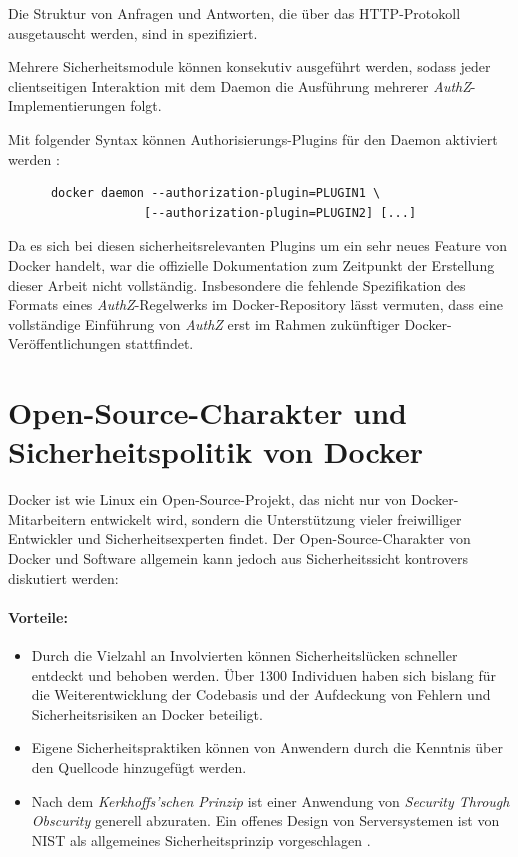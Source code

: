 \documentclass[../main.tex]{subfiles}
\begin{document}
    Die Struktur von Anfragen und Antworten, die über das HTTP-Protokoll ausgetauscht werden, sind in \cite{githubAuthZExtended} spezifiziert.

    Mehrere Sicherheitsmodule können konsekutiv ausgeführt werden, sodass jeder clientseitigen Interaktion mit dem Daemon die Ausführung mehrerer \emph{AuthZ}-Implementierungen folgt.

    Mit folgender Syntax können Authorisierungs-Plugins für den Daemon aktiviert werden \cite{githubAuthZExtended}:

    \begin{lstlisting}
      docker daemon --authorization-plugin=PLUGIN1 \
                   [--authorization-plugin=PLUGIN2] [...]
    \end{lstlisting}

    Da es sich bei diesen sicherheitsrelevanten Plugins um ein sehr neues Feature von Docker handelt, war die offizielle Dokumentation zum Zeitpunkt der Erstellung dieser Arbeit nicht vollständig. Insbesondere die fehlende Spezifikation des Formats eines \emph{AuthZ}-Regelwerks im Docker-Repository lässt vermuten, dass eine vollständige Einführung von \emph{AuthZ} erst im Rahmen zukünftiger Docker-Veröffentlichungen stattfindet.

  \section{Open-Source-Charakter und Sicherheitspolitik von Docker}
  \label{opensource}
    Docker ist wie Linux ein Open-Source-Projekt, das nicht nur von Docker-Mitarbeitern entwickelt wird, sondern die Unterstützung vieler freiwilliger Entwickler und Sicherheitsexperten findet. Der Open-Source-Charakter von Docker und Software allgemein kann jedoch aus Sicherheitssicht kontrovers diskutiert werden:

    \paragraph{Vorteile:}
    \begin{itemize}
      \item Durch die Vielzahl an Involvierten können Sicherheitslücken schneller entdeckt und behoben werden. Über 1300 Individuen haben sich bislang für die Weiterentwicklung der Codebasis und der Aufdeckung von Fehlern und Sicherheitsrisiken an Docker beteiligt.
      \item Eigene Sicherheitspraktiken können von Anwendern durch die Kenntnis über den Quellcode hinzugefügt werden.
      \item Nach dem \emph{Kerkhoffs'schen Prinzip} ist einer Anwendung von \emph{Security Through Obscurity} generell abzuraten. Ein offenes Design von Serversystemen ist von NIST als allgemeines Sicherheitsprinzip vorgeschlagen \cite[S.15]{nist}.
    \end{itemize}
\end{document}
